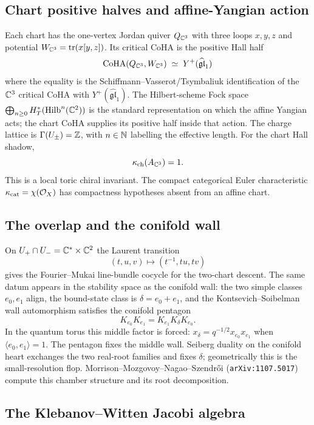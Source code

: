 \subsection*{Chart positive halves and affine-Yangian action}

Each chart has the one-vertex Jordan quiver
$Q_{\mathbb{C}^3}$ with three loops $x,y,z$ and potential
$W_{\mathbb{C}^3}=\mathrm{tr}(x[y,z])$.  Its critical CoHA is the positive Hall half
\[
  \mathrm{CoHA}(Q_{\mathbb{C}^3},W_{\mathbb{C}^3}) \;\simeq\; Y^{+}(\widehat{\mathfrak{gl}}_{1})
\]
where the equality is the Schiffmann--Vasserot/Tsymbaliuk
identification of the $\mathbb{C}^3$ critical CoHA with
$Y^{+}(\widehat{\mathfrak{gl}}_{1})$.  The Hilbert-scheme Fock space
$\bigoplus_{n\ge 0}H^*_T(\mathrm{Hilb}^n(\mathbb{C}^2))$ is the standard representation
on which the affine Yangian acts; the chart CoHA supplies its positive
half inside that action.  The charge lattice is
$\Gamma(U_{\pm})=\mathbb{Z}$, with $n\in\mathbb{N}$ labelling the effective length.
For the chart Hall shadow,
\[
  \kappa_{\mathrm{ch}}(A_{\mathbb{C}^3}) = 1.
\]
This is a local toric chiral invariant.  The compact categorical Euler
characteristic $\kappa_{\mathrm{cat}}=\chi(\mathcal{O}_X)$ has compactness hypotheses absent
from an affine chart.

\subsection*{The overlap and the conifold wall}

On $U_{+}\cap U_{-}=\mathbb{C}^{*}\times\mathbb{C}^{2}$ the Laurent transition
\[
  (t,u,v)\longmapsto (t^{-1},tu,tv)
\]
gives the Fourier--Mukai line-bundle cocycle for the two-chart descent.
The same datum appears in the stability space as the conifold wall:
the two simple classes $e_0,e_1$ align, the bound-state class is
$\delta=e_0+e_1$, and the Kontsevich--Soibelman wall automorphism
satisfies the conifold pentagon
\[
  K_{e_0}K_{e_1}=K_{e_1}K_{\delta}K_{e_0}.
\]
In the quantum torus this middle factor is forced:
$x_\delta=q^{-1/2}x_{e_0}x_{e_1}$ when
$\langle e_0,e_1\rangle=1$.  The pentagon fixes the middle wall.
Seiberg duality on the conifold heart exchanges the two real-root
families and fixes $\delta$; geometrically this is the small-resolution
flop.  Morrison--Mozgovoy--Nagao--Szendr\H{o}i
(\texttt{arXiv:1107.5017}) compute this chamber structure and its root
decomposition.

\subsection*{The Klebanov--Witten Jacobi algebra}


